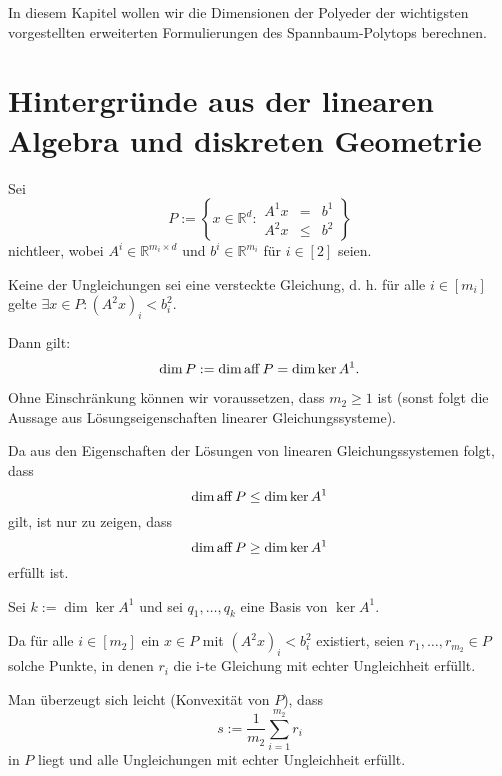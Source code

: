 \documentclass[10p,a4paper,BCOR = 12mm, DIV=15]{scrbook}
\begin{document}
{In diesem Kapitel wollen wir die Dimensionen der Polyeder der wichtigsten vorgestellten erweiterten Formulierungen des Spannbaum-Polytops berechnen.

\section{Hintergründe aus der linearen Algebra und diskreten Geometrie}

\begin{Sa}
\label{sa:dim1}
Sei
\begin{displaymath}
P := \left\{x \in \mathbb{R}^d: 
\begin{array}{ccc}
A^1 x & = & b^1 \\
A^2 x & \leq & b^2
\end{array}\right\}
\end{displaymath}
nichtleer, wobei $A^i \in \mathbb{R}^{m_i \times d}$ und $b^i \in \mathbb{R}^{m_i}$ für $i \in \left[2\right]$ seien.

Keine der Ungleichungen sei eine versteckte Gleichung, d. h. für alle $i \in \left[m_i\right]$ gelte $\exists x \in P: \left(A^2 x\right)_i < b^2_i$.

Dann gilt:
\begin{displaymath}
\dim P := \dim \operatorname{aff} P = \dim \ker A^1.
\end{displaymath}
\end{Sa}
\begin{bew}
Ohne Einschränkung können wir voraussetzen, dass $m_2 \geq 1$ ist (sonst folgt die Aussage aus Lösungseigenschaften linearer Gleichungssysteme).

Da aus den Eigenschaften der Lösungen von linearen Gleichungssystemen folgt, dass
\begin{displaymath}
\dim \operatorname{aff} P \leq \dim \ker A^1
\end{displaymath}
gilt, ist nur zu zeigen, dass
\begin{displaymath}
\dim \operatorname{aff} P \geq \dim \ker A^1
\end{displaymath}
erfüllt ist.

Sei $k:= \dim \ker A^1$ und sei $q_1, \ldots, q_k$ eine Basis von $\ker A^1$.

Da für alle $i \in \left[m_2\right]$ ein $x \in P$ mit $\left(A^2 x\right)_i < b^2_i$ existiert, seien $r_1, \ldots, r_{m_2} \in P$ solche Punkte, in denen $r_i$ die i-te Gleichung mit echter Ungleichheit erfüllt.

Man überzeugt sich leicht (Konvexität von $P$), dass
\begin{displaymath}
s := \frac{1}{m_2} \sum_{i=1}^{m_2} r_i
\end{displaymath}
in $P$ liegt und alle Ungleichungen mit echter Ungleichheit erfüllt.


\end{bew}}
\end{document}
